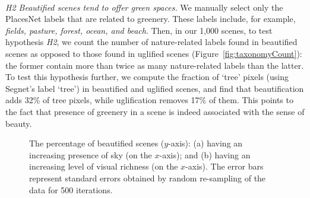 \mbox{ } \\
\noindent
\emph{H2 Beautified scenes tend to offer green spaces.}
We manually select only the PlacesNet labels that are related to greenery. These labels include, for example, \textit{fields, pasture, forest, ocean, and beach}. Then, in our 1,000 scenes, to test hypothesis \emph{H2}, we count the number of nature-related labels found in beautified scenes as opposed to those found in uglified scenes (Figure~\ref{fig:taxonomyCount}): the former contain more than twice as many nature-related labels than the latter.  To test this hypothesis further, we compute the fraction of `tree' pixels (using Segnet's label `tree') in beautified and uglified scenes, and  find that beautification adds  32\% of tree pixels, while uglification removes 17\% of them. This points to the fact that presence of greenery in a scene is indeed associated with the sense of beauty.


\begin{figure}[!t]
    \centering
    \hspace*{-5mm}
    \vspace{-0.4cm}
    \label{fig:bin_figures}
    \caption{The percentage of beautified scenes ($y$-axis): (a) having an increasing presence of sky (on the $x$-axis); and (b) having an increasing level of visual richness  (on the $x$-axis). The error bars represent standard errors obtained by random re-sampling of the data for 500 iterations. }
    \vspace{-0.4cm}
\end{figure}



